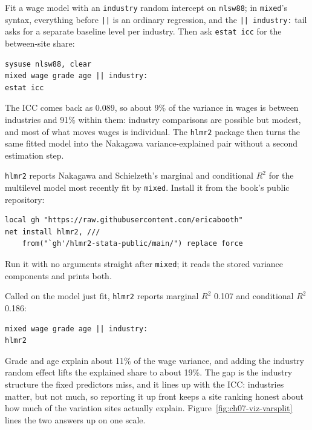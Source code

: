Fit a wage model with an \texttt{industry} random intercept on \texttt{nlsw88}; in \texttt{mixed}'s syntax, everything before \texttt{||} is an ordinary regression, and the \texttt{|| industry:} tail asks for a separate baseline level per industry. Then ask \texttt{estat icc} for the between-site share:
\par
{\footnotesize
\begin{verbatim}
sysuse nlsw88, clear
mixed wage grade age || industry:
estat icc
\end{verbatim}
}
The ICC comes back as 0.089, so about 9\% of the variance in wages is between industries and 91\% within them: industry comparisons are possible but modest, and most of what moves wages is individual. The \texttt{hlmr2} package then turns the same fitted model into the Nakagawa variance-explained pair without a second estimation step.

\begin{kaobox}[frametitle=Package Integration: \texttt{hlmr2}]
\texttt{hlmr2} reports Nakagawa and Schielzeth's marginal and conditional $R^2$ for the multilevel model most recently fit by \texttt{mixed}. Install it from the book's public repository:
\par
{\footnotesize
\begin{verbatim}
local gh "https://raw.githubusercontent.com/ericabooth"
net install hlmr2, ///
    from("`gh'/hlmr2-stata-public/main/") replace force
\end{verbatim}
}
Run it with no arguments straight after \texttt{mixed}; it reads the stored variance components and prints both.
\end{kaobox}

Called on the model just fit, \texttt{hlmr2} reports marginal $R^2$ 0.107 and conditional $R^2$ 0.186:
\par
{\footnotesize
\begin{verbatim}
mixed wage grade age || industry:
hlmr2
\end{verbatim}
}
Grade and age explain about 11\% of the wage variance, and adding the industry random effect lifts the explained share to about 19\%. The gap is the industry structure the fixed predictors miss, and it lines up with the ICC: industries matter, but not much, so reporting it up front keeps a site ranking honest about how much of the variation sites actually explain. Figure~\ref{fig:ch07-viz-varsplit} lines the two answers up on one scale.

